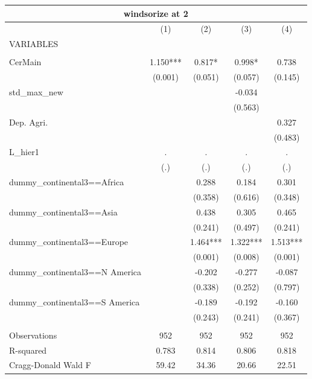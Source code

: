 \documentclass[12pt,a4paper]{article}
\begin{document}
\begin{tabular}{lcccc}
\multicolumn{5}{c}{windsorize at 2} \\ \hline
 & (1) & (2) & (3) & (4) \\
VARIABLES &  &  &  &  \\ \hline
 &  &  &  &  \\
CerMain & 1.150*** & 0.817* & 0.998* & 0.738 \\
 & (0.001) & (0.051) & (0.057) & (0.145) \\
std\_max\_new &  &  & -0.034 &  \\
 &  &  & (0.563) &  \\
Dep. Agri. &  &  &  & 0.327 \\
 &  &  &  & (0.483) \\
L\_hier1 & . & . & . & . \\
 & (.) & (.) & (.) & (.) \\
dummy\_continental3==Africa &  & 0.288 & 0.184 & 0.301 \\
 &  & (0.358) & (0.616) & (0.348) \\
dummy\_continental3==Asia &  & 0.438 & 0.305 & 0.465 \\
 &  & (0.241) & (0.497) & (0.241) \\
dummy\_continental3==Europe &  & 1.464*** & 1.322*** & 1.513*** \\
 &  & (0.001) & (0.008) & (0.001) \\
dummy\_continental3==N America &  & -0.202 & -0.277 & -0.087 \\
 &  & (0.338) & (0.252) & (0.797) \\
dummy\_continental3==S America &  & -0.189 & -0.192 & -0.160 \\
 &  & (0.243) & (0.241) & (0.367) \\
 &  &  &  &  \\
Observations & 952 & 952 & 952 & 952 \\
R-squared & 0.783 & 0.814 & 0.806 & 0.818 \\
 Cragg-Donald Wald F & 59.42 & 34.36 & 20.66 & 22.51 \\ \hline
\end{tabular}
\end{document}
